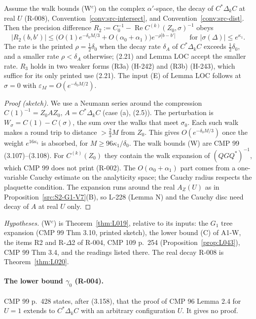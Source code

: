 \begin{proposition}[$R_2$ and $R_3$]\label{src:A2-R2}
Assume the walk bounds (W$^c$) on the complex $\alpha'$-space, the decay of $C^*\Delta_kC$ at real $U$ (R-008), Convention~\ref{conv:src-intersect}, and Convention~\ref{conv:src-dist}. Then the precision difference $R_2:=C_0^{-1}-\operatorname{Re}C^{(k)}(Z_0,\sigma)^{-1}$ obeys
\[
|R_2(b,b')|\le\bigl(O(1)e^{-\delta_0M/3}+O(\alpha_0+\alpha_1)\bigr)e^{-\rho|b-b'|}\qquad\text{for }|\sigma(\Delta)|\le e^{\kappa_1}.
\]
The rate is the printed $\rho=\tfrac12\delta_0$ when the decay rate $\delta_A$ of $C^*\Delta_kC$ exceeds $\tfrac12\delta_0$, and a smaller rate $\rho<\delta_A$ otherwise; (2.21) and Lemma LOC accept the smaller rate. $R_3$ holds in two weaker forms (R3a) (H-242) and (R3b) (H-243), which suffice for its only printed use (2.21). The input (E) of Lemma LOC follows at $\sigma=0$ with $\varepsilon_M=O(e^{-\delta_0M/2})$.
\end{proposition}
\begin{proof}[Proof (sketch)]
We use a Neumann series around the compression $C(1)^{-1}=Z_0AZ_0$, $A=C^*\Delta_kC$ (case (a), (2.5)). The perturbation is $W_\sigma=C(1)-C(\sigma)$, the sum over the walks that meet $\sigma_0$. Each such walk makes a round trip to distance $>\tfrac23M$ from $Z_0$. This gives $O(e^{-\delta_0M/3})$ once the weight $e^{16\kappa_1}$ is absorbed, for $M\ge96\kappa_1/\delta_0$. The walk bounds (W) are CMP 99 (3.107)--(3.108). For $C^{(k)}(Z_0)$ they contain the walk expansion of $(QGQ^*)^{-1}$, which CMP 99 does not print (R-002). The $O(\alpha_0+\alpha_1)$ part comes from a one-variable Cauchy estimate on the analyticity space; the Cauchy radius respects the plaquette condition. The expansion runs around the real $A_Z(U)$ as in Proposition~\ref{src:S2-G1-V7}(B), so L-228 (Lemma N) and the Cauchy disc need decay of $A$ at real $U$ only.
\end{proof}
\emph{Hypotheses.} (W$^c$) is Theorem~\ref{thm:L019}, relative to its inputs: the $G_1$ tree expansion (CMP 99 Thm 3.10, printed sketch), the lower bound (C) of A1-W, the items R2 and R-$\Delta$2 of R-004, CMP 109 p.~254 (Proposition~\ref{prop:L043}), CMP 99 Thm 3.4, and the readings listed there. The real decay R-008 is Theorem~\ref{thm:L020}.

\paragraph{The lower bound $\gamma_0$ (R-004).}
CMP 99 p.~428 states, after (3.158), that the proof of CMP 96 Lemma 2.4 for $U=1$ extends to $C^*\Delta_kC$ with an arbitrary configuration $U$. It gives no proof.

